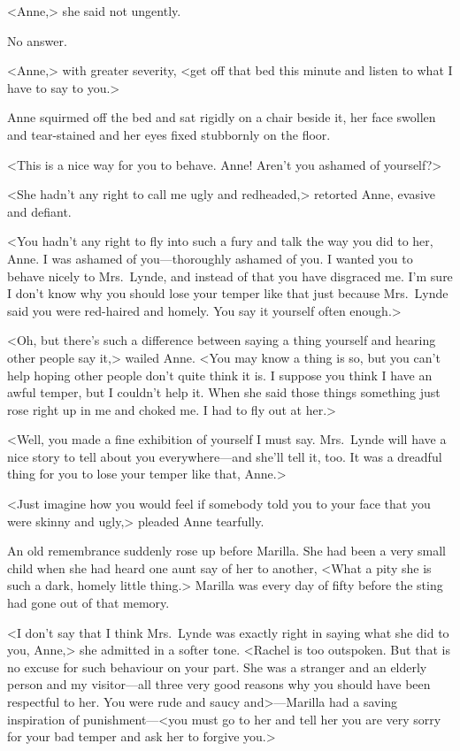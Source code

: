<Anne,> she said not ungently.

No answer.

<Anne,> with greater severity, <get off that bed this minute and listen to what I have to say to you.>

Anne squirmed off the bed and sat rigidly on a chair beside it, her face swollen and tear-stained and her eyes fixed stubbornly on the floor.

<This is a nice way for you to behave. Anne! Aren't you ashamed of yourself?>

<She hadn't any right to call me ugly and redheaded,> retorted Anne, evasive and defiant.

<You hadn't any right to fly into such a fury and talk the way you did to her, Anne. I was ashamed of you—thoroughly ashamed of you. I wanted you to behave nicely to Mrs.~Lynde, and instead of that you have disgraced me. I'm sure I don't know why you should lose your temper like that just because Mrs.~Lynde said you were red-haired and homely. You say it yourself often enough.>

<Oh, but there's such a difference between saying a thing yourself and hearing other people say it,> wailed Anne. <You may know a thing is so, but you can't help hoping other people don't quite think it is. I suppose you think I have an awful temper, but I couldn't help it. When she said those things something just rose right up in me and choked me. I had to fly out at her.>

<Well, you made a fine exhibition of yourself I must say. Mrs.~Lynde will have a nice story to tell about you everywhere—and she'll tell it, too. It was a dreadful thing for you to lose your temper like that, Anne.>

<Just imagine how you would feel if somebody told you to your face that you were skinny and ugly,> pleaded Anne tearfully.

An old remembrance suddenly rose up before Marilla. She had been a very small child when she had heard one aunt say of her to another, <What a pity she is such a dark, homely little thing.> Marilla was every day of fifty before the sting had gone out of that memory.

<I don't say that I think Mrs.~Lynde was exactly right in saying what she did to you, Anne,> she admitted in a softer tone. <Rachel is too outspoken. But that is no excuse for such behaviour on your part. She was a stranger and an elderly person and my visitor—all three very good reasons why you should have been respectful to her. You were rude and saucy and>—Marilla had a saving inspiration of punishment—<you must go to her and tell her you are very sorry for your bad temper and ask her to forgive you.>

